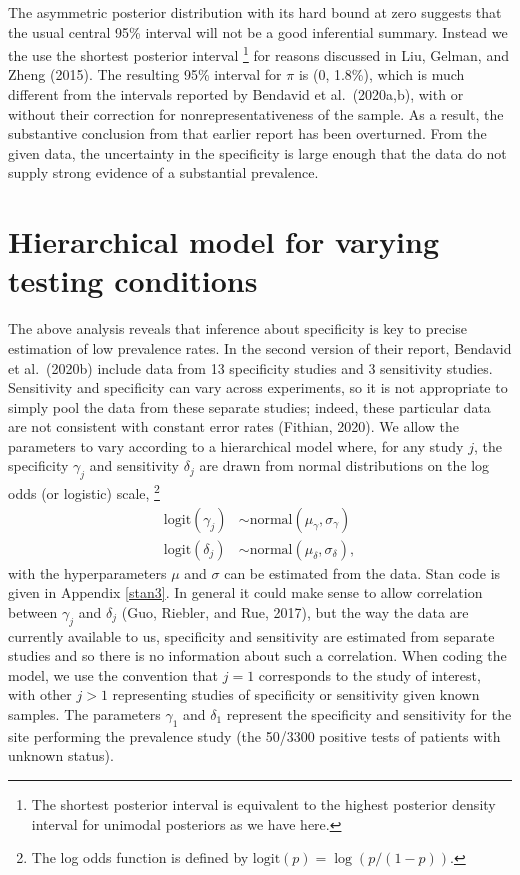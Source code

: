 \documentclass[11pt]{article}
\begin{document}
The asymmetric posterior distribution with its hard bound at zero
suggests that the usual central 95\% interval will not be a good
inferential summary.  Instead we the use the shortest posterior
interval%
% 
\footnote{The shortest posterior interval is equivalent to the highest
  posterior density interval for unimodal posteriors as we have here.}
%
for reasons discussed in Liu, Gelman, and Zheng
(2015). The resulting 95\% interval for $\pi$ is (0, 1.8\%), which is
much different from the intervals reported by Bendavid et al.\
(2020a,b), with or without their correction for nonrepresentativeness
of the sample.  As a result, the substantive conclusion from that
earlier report has been overturned. From the given data, the
uncertainty in the specificity is large enough that the data do not
supply strong evidence of a substantial prevalence.

\section{Hierarchical model for varying testing conditions}\label{model2}

The above analysis reveals that inference about specificity is key to
precise estimation of low prevalence rates.  In the second version of
their report, Bendavid et al.\ (2020b) include data from 13
specificity studies and 3 sensitivity studies.  Sensitivity and
specificity can vary across experiments, so it is not appropriate to
simply pool the data from these separate studies; indeed, these
particular data are not consistent with constant error rates (Fithian,
2020). We allow the parameters to vary according to a hierarchical
model where, for any study $j$, the specificity $\gamma_j$ and
sensitivity $\delta_j$ are drawn from normal distributions on the
log odds (or logistic) scale,%
%
\footnote{The log odds function is defined by $\textrm{logit}(p) = \log(p / (1 - p)).$}
%
\begin{align*}
  \mbox{logit}(\gamma_j) & \sim \mbox{normal}(\mu_{\gamma}, \sigma_{\gamma})\\
 \mbox{logit}(\delta_j) & \sim \mbox{normal}(\mu_{\delta}, \sigma_{\delta}),
\end{align*}
%
with the hyperparameters $\mu$ and $\sigma$ can be estimated from the
data.  Stan code is given in Appendix \ref{stan3}.  In general it
could make sense to allow correlation between $\gamma_j$ and
$\delta_j$ (Guo, Riebler, and Rue, 2017), but the way the data are
currently available to us, specificity and sensitivity are estimated
from separate studies and so there is no information about such a
correlation.  When coding the model, we use the convention that $j=1$
corresponds to the study of interest, with other $j > 1$ representing
studies of specificity or sensitivity given known samples.  The
parameters $\gamma_1$ and $\delta_1$ represent the specificity and
sensitivity for the site performing the prevalence study (the 50/3300
positive tests of patients with unknown status).
\end{document}
